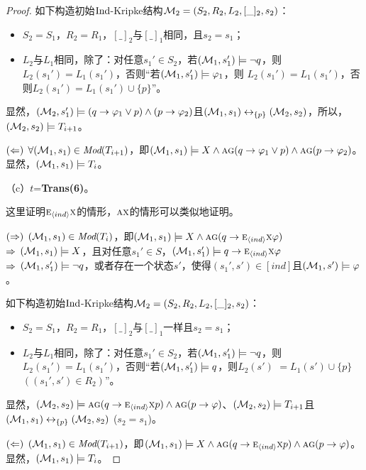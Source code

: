 \begin{proof}
	如下构造初始$\textrm{Ind}$-Kripke结构${\cal M}_2=(S_2,R_2,L_2,[\_]_2,s_2)$：
	\begin{itemize}
		\item $S_2=S_1$，$R_2=R_1$，$[\_]_2$与$[\_]_1$相同，且$s_2=s_1$；
		\item $L_2$与$L_1$相同，除了：对任意$s_1'\in S_2$，若$({\cal M}_1, s_1') \models \neg q$，则$L_2(s_1') = L_1(s_1')$，否则“若$({\cal M}_1,s_1') \models \varphi_1$，则 $L_2(s_1')=L_1(s_1')$，否则$L_2(s_1')=L_1(s_1') \cup \{p\}$”。
	\end{itemize}
	显然，$({\cal M}_2,s_1') \models (q\rightarrow \varphi_1 \vee p) \wedge (p \rightarrow \varphi_2)$且$({\cal M}_1, s_1) \leftrightarrow_{\{p\}} ({\cal M}_2, s_2)$，所以，$({\cal M}_2,s_2) \models T_{i+1}$。
	
	$(\Leftarrow)$  $\forall ({\cal M}_1, s_1) \in \textit{Mod}(T_{i+1})$，即$({\cal M}_1,s_1) \models X \wedge \textsc{a}\textsc{g} (q\rightarrow \varphi_1 \vee p) \wedge \textsc{a}\textsc{g}(p \rightarrow \varphi_2)$。 显然，$({\cal M}_1, s_1) \models T_i$。
	
	（c）$t$=\textbf{Trans(6)}。
	
	这里证明$\textsc{e}_{{\langle{ind}\rangle}} \textsc{x}$的情形，$\textsc{a} \textsc{x}$的情形可以类似地证明。
	
	$(\Rightarrow)$ $({\cal M}_1,s_1) \in \textit{Mod}(T_i)$，即$({\cal M}_1,s_1) \models X \wedge \textsc{a}\textsc{g}(q \rightarrow \textsc{e}_{{\langle{ind}\rangle}}\textsc{x} \varphi)$\\
	$\Rightarrow$ $({\cal M}_1,s_1) \models X$，且对任意$s_1'\in S$，$({\cal M}_1,s_1') \models q \rightarrow \textsc{e}_{{\langle{ind}\rangle}} \textsc{x} \varphi$\\
	$\Rightarrow$ $({\cal M}_1,s_1') \models \neg q$，或者存在一个状态$s'$，使得$(s_1', s') \in [ind]$且$({\cal M}_1,s') \models \varphi$。
	
	如下构造初始$\textrm{Ind}$-Kripke结构${\cal M}_2=(S_2,R_2,L_2,[\_]_2,s_2)$：
	\begin{itemize}
		\item $S_2=S_1$，$R_2=R_1$，$[\_]_2$与$[\_]_1$一样且$s_2=s_1$；
		\item $L_2$与$L_1$相同，除了：对任意$s_1'\in S_2$，若$({\cal M}_1, s_1') \models \neg q$，则$L_2(s_1') = L_1(s_1')$，否则“若$({\cal M}_1,s_1') \models q$，则$L_2(s')$ $=L_1(s')\cup \{p\}$ $((s_1',s')\in R_2)$”。
	\end{itemize}
	显然，$({\cal M}_2,s_2) \models \textsc{a}\textsc{g}(q\rightarrow \textsc{e}_{{\langle{ind}\rangle}} \textsc{x} p) \wedge \textsc{a}\textsc{g}(p \rightarrow \varphi)$、$({\cal M}_2,s_2) \models T_{i+1}$且$({\cal M}_1, s_1) \leftrightarrow_{\{p\}} ({\cal M}_2, s_2)$ ($s_2=s_1$)。
	
	$(\Leftarrow)$ $({\cal M}_1, s_1) \in \textit{Mod}(T_{i+1})$，即$({\cal M}_1,s_1) \models X \wedge \textsc{a}\textsc{g}(q\rightarrow \textsc{e}_{{\langle{ind}\rangle}} \textsc{x} p) \wedge \textsc{a}\textsc{g}(p \rightarrow \varphi)$。显然，$({\cal M}_1, s_1) \models T_i$。
\end{proof}
 
